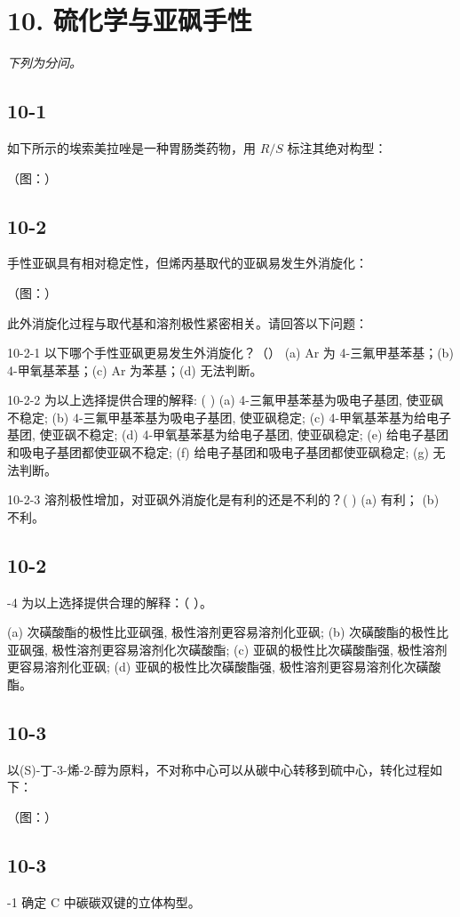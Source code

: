 \section*{10. 硫化学与亚砜手性}
\textit{下列为分问。}

\subsection*{10-1}
如下所示的埃索美拉唑是一种胃肠类药物，用 $R / S$ 标注其绝对构型：

（图：）

\subsection*{10-2}
手性亚砜具有相对稳定性，但烯丙基取代的亚砜易发生外消旋化：

（图：）

此外消旋化过程与取代基和溶剂极性紧密相关。请回答以下问题：

10-2-1 以下哪个手性亚砜更易发生外消旋化？（）
(a) Ar 为 4-三氟甲基苯基；(b) 4-甲氧基苯基；(c) Ar 为苯基；(d) 无法判断。

10-2-2 为以上选择提供合理的解释: ( )
(a) 4-三氟甲基苯基为吸电子基团, 使亚砜不稳定; (b) 4-三氟甲基苯基为吸电子基团, 使亚砜稳定; (c) 4-甲氧基苯基为给电子基团, 使亚砜不稳定; (d) 4-甲氧基苯基为给电子基团, 使亚砜稳定; (e) 给电子基团和吸电子基团都使亚砜不稳定; (f) 给电子基团和吸电子基团都使亚砜稳定; (g) 无法判断。

10-2-3 溶剂极性增加，对亚砜外消旋化是有利的还是不利的？( )
(a) 有利； (b) 不利。

\subsection*{10-2}
-4 为以上选择提供合理的解释：（ ）。

(a) 次磺酸酯的极性比亚砜强, 极性溶剂更容易溶剂化亚砜; (b) 次磺酸酯的极性比亚砜强, 极性溶剂更容易溶剂化次磺酸酯; (c) 亚砜的极性比次磺酸酯强, 极性溶剂更容易溶剂化亚砜; (d) 亚砜的极性比次磺酸酯强, 极性溶剂更容易溶剂化次磺酸酯。

\subsection*{10-3}
以(S)-丁-3-烯-2-醇为原料，不对称中心可以从碳中心转移到硫中心，转化过程如下：

（图：）

\subsection*{10-3}
-1 确定 C 中碳碳双键的立体构型。

